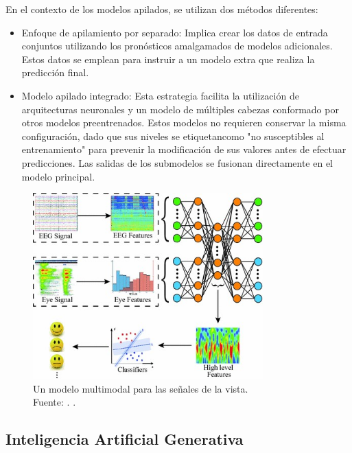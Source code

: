 En el contexto de los modelos apilados, se utilizan dos métodos diferentes:

\begin{itemize}
    \item Enfoque de apilamiento por separado: Implica crear los datos de entrada conjuntos utilizando los pronósticos amalgamados de modelos adicionales. Estos datos se emplean para instruir a un modelo extra que realiza la predicción final.
	\item Modelo apilado integrado: Esta estrategia facilita la utilización de arquitecturas neuronales y un modelo de múltiples cabezas conformado por otros modelos preentrenados. Estos modelos no requieren conservar la misma configuración, dado que sus niveles se etiquetancomo "no susceptibles al entrenamiento" para prevenir la modificación de sus valores antes de efectuar predicciones. Las salidas de los submodelos se fusionan directamente en el modelo principal.
\end{itemize}

\begin{figure}[!ht]
	\begin{center}
		\includegraphics[width=0.79\textwidth]{2/figures/multimodal_deep_learning_example.jpg}
		\caption[Un modelo multimodal para las señales de la vista]{Un modelo multimodal para las señales de la vista.\\
		Fuente: \cite{tec_baheti2020introduction_mdl}. .}
		\label{2:fig58}
	\end{center}
\end{figure}

\subsection{Inteligencia Artificial Generativa}

